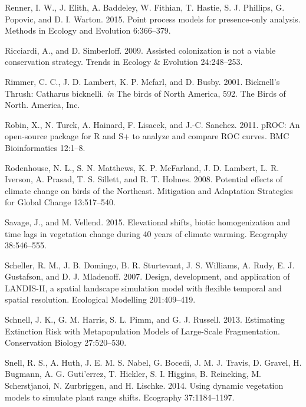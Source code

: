 \documentclass[12pt]{article}
\newlength{\cslhangindent}
\newenvironment{cslreferences}%
  {\setlength{\parindent}{0pt}%
  \everypar{\setlength{\hangindent}{\cslhangindent}}\ignorespaces}%
  {\par}
\begin{document}
\begin{cslreferences}
\leavevmode\hypertarget{ref-renner_point_2015}{}%
Renner, I. W., J. Elith, A. Baddeley, W. Fithian, T. Hastie, S. J.
Phillips, G. Popovic, and D. I. Warton. 2015. Point process models for
presence‐only analysis. Methods in Ecology and Evolution 6:366--379.

\leavevmode\hypertarget{ref-ricciardi_assisted_2009}{}%
Ricciardi, A., and D. Simberloff. 2009. Assisted colonization is not a
viable conservation strategy. Trends in Ecology \& Evolution
24:248--253.

\leavevmode\hypertarget{ref-rimmer_bicknells_2001}{}%
Rimmer, C. C., J. D. Lambert, K. P. Mcfarl, and D. Busby. 2001.
Bicknell's Thrush: Catharus bicknelli. \emph{in} The birds of North
America, 592. The Birds of North. America, Inc.

\leavevmode\hypertarget{ref-robin_proc_2011}{}%
Robin, X., N. Turck, A. Hainard, F. Lisacek, and J.-C. Sanchez. 2011.
pROC: An open-source package for R and S+ to analyze and compare ROC
curves. BMC Bioinformatics 12:1--8.

\leavevmode\hypertarget{ref-rodenhouse_potential_2008}{}%
Rodenhouse, N. L., S. N. Matthews, K. P. McFarland, J. D. Lambert, L. R.
Iverson, A. Prasad, T. S. Sillett, and R. T. Holmes. 2008. Potential
effects of climate change on birds of the Northeast. Mitigation and
Adaptation Strategies for Global Change 13:517--540.

\leavevmode\hypertarget{ref-savage_elevational_2015}{}%
Savage, J., and M. Vellend. 2015. Elevational shifts, biotic
homogenization and time lags in vegetation change during 40 years of
climate warming. Ecography 38:546--555.

\leavevmode\hypertarget{ref-scheller_design_2007}{}%
Scheller, R. M., J. B. Domingo, B. R. Sturtevant, J. S. Williams, A.
Rudy, E. J. Gustafson, and D. J. Mladenoff. 2007. Design, development,
and application of LANDIS-II, a spatial landscape simulation model with
flexible temporal and spatial resolution. Ecological Modelling
201:409--419.

\leavevmode\hypertarget{ref-schnell_estimating_2013}{}%
Schnell, J. K., G. M. Harris, S. L. Pimm, and G. J. Russell. 2013.
Estimating Extinction Risk with Metapopulation Models of Large-Scale
Fragmentation. Conservation Biology 27:520--530.

\leavevmode\hypertarget{ref-snell_using_2014}{}%
Snell, R. S., A. Huth, J. E. M. S. Nabel, G. Bocedi, J. M. J. Travis, D.
Gravel, H. Bugmann, A. G. Guti\a'errez, T. Hickler, S. I. Higgins, B.
Reineking, M. Scherstjanoi, N. Zurbriggen, and H. Lischke. 2014. Using
dynamic vegetation models to simulate plant range shifts. Ecography
37:1184--1197.


\end{cslreferences}
\end{document}
